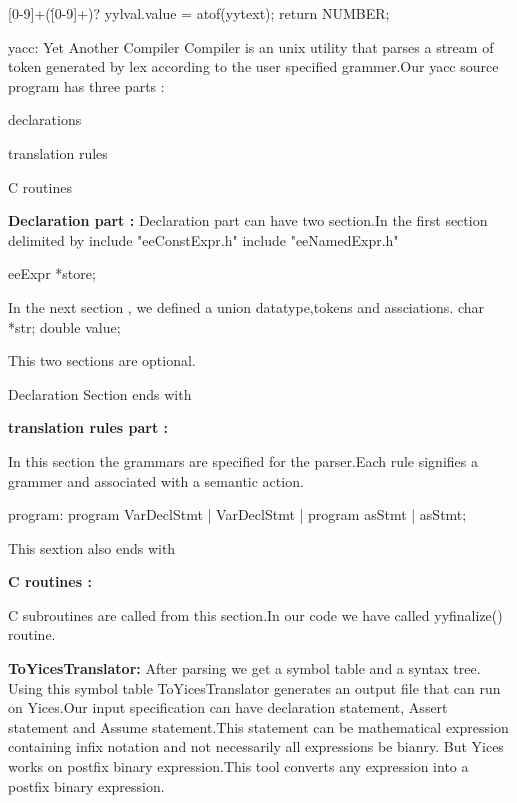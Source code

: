 \documentclass{svmult}
\begin{document}
[0-9]+(\.[0-9]+)? { 
    yylval.value = atof(yytext);
    return NUMBER;
}

yacc: Yet Another Compiler Compiler is an unix utility that parses a stream
of token generated by lex according to the user specified grammer.Our yacc source 
program has three parts :
  
  declarations
  
    
  translation rules
  
  
  C routines
  
{\bf Declaration part :}
  Declaration part can have two section.In the first section delimited by 
  include "eeConstExpr.h"
  include "eeNamedExpr.h"
  
  eeExpr *store;
    
  In the next section , we defined a union datatype,tokens and assciations.
  {
    char *str;
    double value;
  }


 
 This two sections are optional.
 
 Declaration Section ends with %
 
 {\bf translation rules part :}
 
 In this section the grammars are specified for the parser.Each rule signifies 
 a grammer and associated with a semantic action.
 
 program: program VarDeclStmt | VarDeclStmt | program asStmt | asStmt;
    
 
This sextion also ends with %

{\bf C routines :}

C subroutines are called from this section.In our code we have called
yyfinalize() routine.
   
   

\noindent
{\bf ToYicesTranslator:} After parsing we get a symbol table and a syntax tree.
Using this symbol table ToYicesTranslator generates an output file that can run 
on Yices.Our input specification can have declaration statement, Assert statement 
and Assume statement.This statement can be mathematical expression containing infix 
notation and not necessarily all expressions be bianry. But Yices works on postfix 
binary expression.This tool converts any expression into a postfix binary expression.
\end{document}
